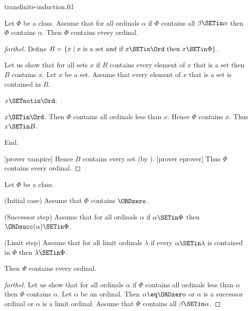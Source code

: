 \documentclass{stex}
\begin{document}
\begin{smodule}{transfinite-induction.ftl}

\begin{theorem}[forthel,id=SET_THEORY_02_8493935460614144]
  Let $\Phi$ be a class.
  Assume that for all ordinals $\alpha$ if $\Phi$ contains all $\beta \SETin \alpha$ then $\Phi$ contains $\alpha$.
  Then $\Phi$ contains every ordinal.
\end{theorem}
\begin{proof}[forthel]
  Define $B = \{ x \mid x\text{ is a set and if }x \SETin \Ord\text{ then }x \SETin \Phi \}$.

  Let us show that for all sets $x$ if $B$ contains every element of $x$ that is a set then $B$ contains $x$.
    Let $x$ be a set.
    Assume that every element of $x$ that is a set is contained in $B$.

    \begin{case}{$x \SETnotin \Ord$.} \end{case}

    \begin{case}{$x \SETin \Ord$.}
      Then $\Phi$ contains all ordinals less than $x$.
      Hence $\Phi$ contains $x$.
      Thus $x \SETin B$.
    \end{case}
  End.

  [prover vampire]
  Hence $B$ contains every set (by ).
  [prover eprover]
  Thus $\Phi$ contains every ordinal.
\end{proof}

\begin{theorem}[forthel,id=SET_THEORY_02_7892040431960064]
  Let $\Phi$ be a class.
  
  (Initial case) Assume that $\Phi$ contains $\ORDzero$.
  
  (Successor step) Assume that for all ordinals $\alpha$ if $\alpha \SETin \Phi$ then $\ORDsucc(\alpha) \SETin \Phi$.
  
  (Limit step) Assume that for all limit ordinals $\lambda$ if every $\alpha \SETin \lambda$ is contained in $\Phi$ then $\lambda \SETin \Phi$.
  
  Then $\Phi$ contains every ordinal.
\end{theorem}
\begin{proof}[forthel]
  Let us show that for all ordinals $\alpha$ if $\Phi$ contains all ordinals
  less than $\alpha$ then $\Phi$ contains $\alpha$.
    Let $\alpha$ be an ordinal.
    Then $\alpha \eq \ORDzero$ or $\alpha$ is a successor ordinal or $\alpha$ is a
    limit ordinal.
    Assume that $\Phi$ contains all $\beta \SETin \alpha$.


\end{proof}
\end{smodule}
\end{document}

